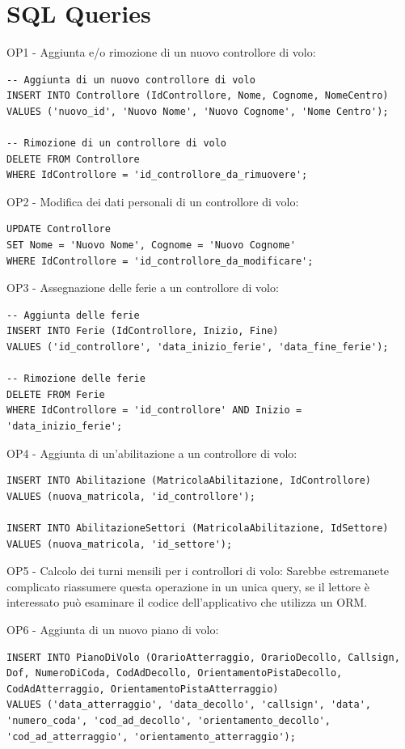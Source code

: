 \section*{SQL Queries}

OP1 - Aggiunta e/o rimozione di un nuovo controllore di volo:
\begin{lstlisting}
-- Aggiunta di un nuovo controllore di volo
INSERT INTO Controllore (IdControllore, Nome, Cognome, NomeCentro)
VALUES ('nuovo_id', 'Nuovo Nome', 'Nuovo Cognome', 'Nome Centro');

-- Rimozione di un controllore di volo
DELETE FROM Controllore
WHERE IdControllore = 'id_controllore_da_rimuovere';
\end{lstlisting}

OP2 - Modifica dei dati personali di un controllore di volo:
\begin{lstlisting}
UPDATE Controllore
SET Nome = 'Nuovo Nome', Cognome = 'Nuovo Cognome'
WHERE IdControllore = 'id_controllore_da_modificare';
\end{lstlisting}

OP3 - Assegnazione delle ferie a un controllore di volo:
\begin{lstlisting}
-- Aggiunta delle ferie
INSERT INTO Ferie (IdControllore, Inizio, Fine)
VALUES ('id_controllore', 'data_inizio_ferie', 'data_fine_ferie');

-- Rimozione delle ferie
DELETE FROM Ferie
WHERE IdControllore = 'id_controllore' AND Inizio = 'data_inizio_ferie';
\end{lstlisting}

OP4 - Aggiunta di un'abilitazione a un controllore di volo:
\begin{lstlisting}
INSERT INTO Abilitazione (MatricolaAbilitazione, IdControllore)
VALUES (nuova_matricola, 'id_controllore');

INSERT INTO AbilitazioneSettori (MatricolaAbilitazione, IdSettore)
VALUES (nuova_matricola, 'id_settore');
\end{lstlisting}

OP5 - Calcolo dei turni mensili per i controllori di volo:
Sarebbe estremanete complicato riassumere questa operazione in un unica query, se il lettore è interessato può esaminare il codice dell'applicativo che utilizza un ORM.

OP6 - Aggiunta di un nuovo piano di volo:
\begin{lstlisting}
INSERT INTO PianoDiVolo (OrarioAtterraggio, OrarioDecollo, Callsign, Dof, NumeroDiCoda, CodAdDecollo, OrientamentoPistaDecollo, CodAdAtterraggio, OrientamentoPistaAtterraggio)
VALUES ('data_atterraggio', 'data_decollo', 'callsign', 'data', 'numero_coda', 'cod_ad_decollo', 'orientamento_decollo', 'cod_ad_atterraggio', 'orientamento_atterraggio');
\end{lstlisting}


